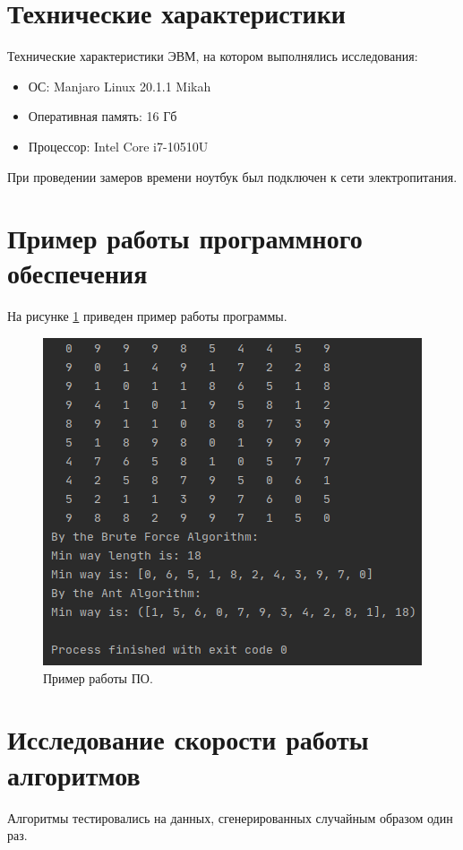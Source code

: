 \documentclass[12pt]{report}
\begin{document}
\section{Технические характеристики}
Технические характеристики ЭВМ, на котором выполнялись исследования:
\begin{itemize}
\item ОС: Manjaro Linux 20.1.1 Mikah
\item Оперативная память: 16 Гб
\item Процессор: Intel Core i7-10510U
\end{itemize}

При проведении замеров времени ноутбук был подключен к сети электропитания.

\section{Пример работы программного обеспечения}
На рисунке \ref{img:example} приведен пример работы программы.

\begin{figure}
\begin{center}
\includegraphics[scale=0.9]{inc/img/example.png}
\captionsetup{justification=centering}
	\caption{Пример работы ПО.}
	\label{img:example}	
\end{center}
\end{figure}

\newpage

\section{Исследование скорости работы алгоритмов}
Алгоритмы тестировались на данных, сгенерированных случайным образом один раз.
\end{document}

